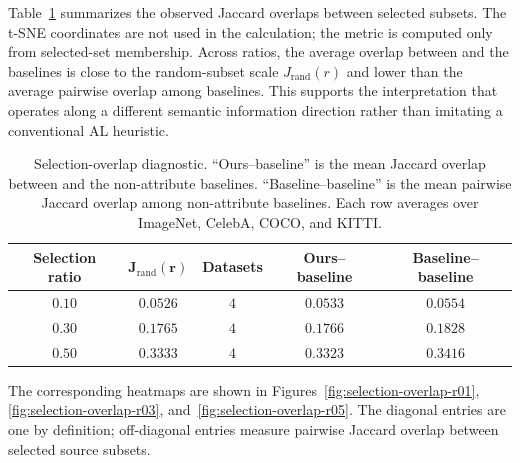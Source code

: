 Table~\ref{tab:selection-overlap-summary} summarizes the observed Jaccard overlaps between selected subsets. The t-SNE coordinates are not used in the calculation; the metric is computed only from selected-set membership. Across ratios, the average overlap between \model and the baselines is close to the random-subset scale $J_{\mathrm{rand}}(r)$ and lower than the average pairwise overlap among baselines. This supports the interpretation that \model operates along a different semantic information direction rather than imitating a conventional AL heuristic.

\begin{table}[h]
\centering
\caption{Selection-overlap diagnostic. ``Ours--baseline'' is the mean Jaccard overlap between \model and the non-attribute baselines. ``Baseline--baseline'' is the mean pairwise Jaccard overlap among non-attribute baselines. Each row averages over ImageNet, CelebA, COCO, and KITTI.}
\label{tab:selection-overlap-summary}
\begin{tabular}{c c c c c}
\toprule
\rowcolor{sectiongray} \textbf{Selection ratio} & $\boldsymbol{J_{\mathrm{rand}}(r)}$ & \textbf{Datasets} & \textbf{Ours--baseline} & \textbf{Baseline--baseline} \\
\midrule
$0.10$ & $0.0526$ & $4$ & $0.0533$ & $0.0554$ \\
$0.30$ & $0.1765$ & $4$ & $0.1766$ & $0.1828$ \\
$0.50$ & $0.3333$ & $4$ & $0.3323$ & $0.3416$ \\
\bottomrule
\end{tabular}
\end{table}

The corresponding heatmaps are shown in Figures~\ref{fig:selection-overlap-r01}, \ref{fig:selection-overlap-r03}, and~\ref{fig:selection-overlap-r05}. The diagonal entries are one by definition; off-diagonal entries measure pairwise Jaccard overlap between selected source subsets.

